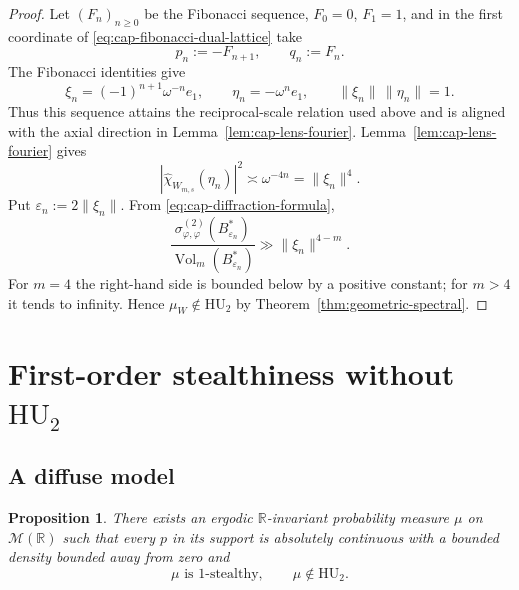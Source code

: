 \documentclass[11pt,reqno,a4paper]{amsart}
\numberwithin{equation}{section}
\theoremstyle{compact}
\newtheorem{proposition}[proposition]{Proposition}
\theoremstyle{definition}
\theoremstyle{definition}
\newcommand{\HU}{\mathrm{HU}}
\newcommand{\Vol}{\operatorname{Vol}}
\newcommand{\cM}{\mathcal M}
\begin{document}
\begin{proof}
Let \((F_n)_{n\geq0}\) be the Fibonacci sequence, \(F_0=0\), \(F_1=1\),
and in the first coordinate of
\eqref{eq:cap-fibonacci-dual-lattice} take
\begin{equation}\label{eq:cap-fibonacci-approximants}
  p_n:=-F_{n+1},
  \qquad
  q_n:=F_n.
\end{equation}
The Fibonacci identities give
\begin{equation}\label{eq:cap-fibonacci-dual-sequence}
  \xi_n=(-1)^{n+1}\omega^{-n}e_1,
  \qquad
  \eta_n=-\omega^n e_1,
  \qquad
  \|\xi_n\|\,\|\eta_n\|=1.
\end{equation}
Thus this sequence attains the reciprocal-scale relation used above and is
aligned with the axial direction in Lemma~\ref{lem:cap-lens-fourier}.
Lemma~\ref{lem:cap-lens-fourier} gives
\begin{equation}\label{eq:cap-lens-atom-asymptotic}
  |\widehat{\chi}_{W_{m,s}}(\eta_n)|^2
  \asymp\omega^{-4n}
  =\|\xi_n\|^4.
\end{equation}
Put \(\varepsilon_n:=2\|\xi_n\|\).  From
\eqref{eq:cap-diffraction-formula},
\begin{equation}\label{eq:cap-higher-normalized-divergence}
  \frac{\sigma^{(2)}_{\varphi,\varphi}(B_{\varepsilon_n}^*)}
       {\Vol_m(B_{\varepsilon_n}^*)}
  \gg \|\xi_n\|^{4-m}.
\end{equation}
For \(m=4\) the right-hand side is bounded below by a positive constant;
for \(m>4\) it tends to infinity.  Hence \(\mu_W\notin\HU_2\) by
Theorem~\ref{thm:geometric-spectral}.
\end{proof}


\section{First-order stealthiness without \texorpdfstring{$\HU_2$}{HU2}}
\label{sec:stealthy-nonhu2}

\subsection{A diffuse model}
\label{subsec:simple-stealthy-example}

\begin{proposition}
\label{prop:beat-frequency-example}
There exists an ergodic $\mathbb R$-invariant probability measure $\mu$ on
$\cM(\mathbb R)$ such that every $p$ in its support is absolutely continuous
with a bounded density bounded away from zero and
\begin{equation}\label{eq:beat-main-conclusion}
  \mu\text{ is $1$-stealthy},
  \qquad
  \mu\notin\HU_2.
\end{equation}
\end{proposition}
\end{document}
